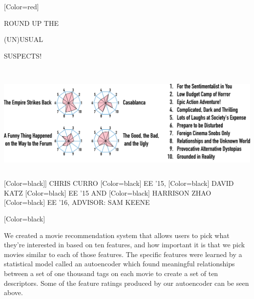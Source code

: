 \documentclass{article}
\begin{document}
\begin{minipage}[c]{28in}
{ 
[Color=red]
\fontsize{3.5in}{0.5in}\selectfont 
\bfseries





ROUND UP THE

\vspace{0.5in}

{ (UN)}USUAL 

\vspace{0.5in}

SUSPECTS!

}
\end{minipage}
\vspace{1in}\\
\colorbox{white}{
\begin{minipage}{28in}
\centering
\includegraphics[width=27in]{figure.pdf}
\end{minipage}
}
\vspace{1in}\\
{
[Color=black]]
\fontsize{1in}{1em}\selectfont 
CHRIS CURRO
}
{
[Color=black]
\fontsize{0.8in}{1em}\selectfont 
EE '15,
}
{
[Color=black]
\fontsize{1in}{1em}\selectfont 
DAVID KATZ
}
{
[Color=black]
\fontsize{0.8in}{1em}\selectfont 
EE '15 AND
}
{
[Color=black]
\fontsize{1in}{1em}\selectfont 
HARRISON ZHAO
}
{
[Color=black]
\fontsize{0.8in}{1em}\selectfont 
EE '16, ADVISOR: SAM KEENE
}
\vspace{0.8in}\\
\begin{minipage}{15.5in}
{
	[Color=black]
	\fontsize{0.6in}{8em}\selectfont

	We created a movie recommendation system that allows users to pick what
	they're interested in based on ten features, and how important it is that we
	pick movies similar to each of those features. The specific features were
	learned by a statistical model called an autoencoder which found
	meaningful relationships between a set of one thousand tags on each movie
	to create a set of ten descriptors. Some of the feature ratings produced by
	our autoencoder can be seen above.


}
\end{minipage} 
\end{document}
